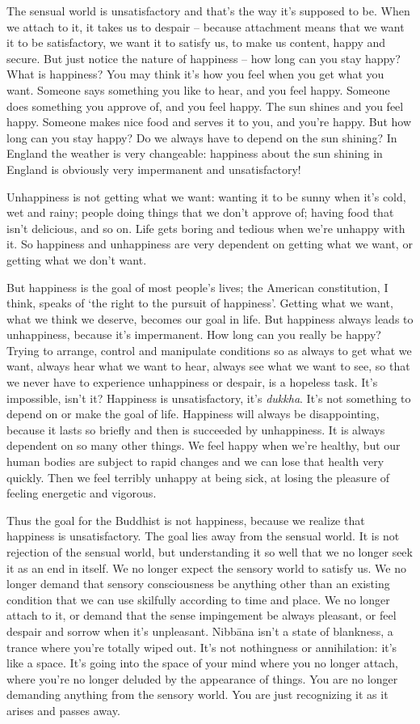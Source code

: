 The sensual world is unsatisfactory and that's the way it's supposed to be. When we attach to it, it takes us to despair -- because attachment means that we want it to be satisfactory, we want it to satisfy us, to make us content, happy and secure. But just notice the nature of happiness -- how long can you stay happy? What is happiness? You may think it's how you feel when you get what you want. Someone says something you like to hear, and you feel happy. Someone does something you approve of, and you feel happy. The sun shines and you feel happy. Someone makes nice food and serves it to you, and you're happy. But how long can you stay happy? Do we always have to depend on the sun shining? In England the weather is very changeable: happiness about the sun shining in England is obviously very impermanent and unsatisfactory!

Unhappiness is not getting what we want: wanting it to be sunny when it's cold, wet and rainy; people doing things that we don't approve of; having food that isn't delicious, and so on. Life gets boring and tedious when we're unhappy with it. So happiness and unhappiness are very dependent on getting what we want, or getting what we don't want.

But happiness is the goal of most people's lives; the American constitution, I think, speaks of `the right to the pursuit of happiness'. Getting what we want, what we think we deserve, becomes our goal in life. But happiness always leads to unhappiness, because it's impermanent. How long can you really be happy? Trying to arrange, control and manipulate conditions so as always to get what we want, always hear what we want to hear, always see what we want to see, so that we never have to experience unhappiness or despair, is a hopeless task. It's impossible, isn't it? Happiness is unsatisfactory, it's \textit{dukkha}. It's not something to depend on or make the goal of life. Happiness will always be disappointing, because it lasts so briefly and then is succeeded by unhappiness. It is always dependent on so many other things. We feel happy when we're healthy, but our human bodies are subject to rapid changes and we can lose that health very quickly. Then we feel terribly unhappy at being sick, at losing the pleasure of feeling energetic and vigorous.

Thus the goal for the Buddhist is not happiness, because we realize that happiness is unsatisfactory. The goal lies away from the sensual world. It is not rejection of the sensual world, but understanding it so well that we no longer seek it as an end in itself. We no longer expect the sensory world to satisfy us. We no longer demand that sensory consciousness be anything other than an existing condition that we can use skilfully according to time and place. We no longer attach to it, or demand that the sense impingement be always pleasant, or feel despair and sorrow when it's unpleasant. Nibb\=ana isn't a state of blankness, a trance where you're totally wiped out. It's not nothingness or annihilation: it's like a space. It's going into the space of your mind where you no longer attach, where you're no longer deluded by the appearance of things. You are no longer demanding anything from the sensory world. You are just recognizing it as it arises and passes away.

